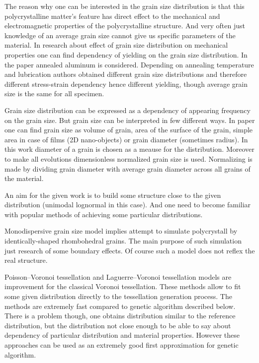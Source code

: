 \documentclass[12pt]{report}
\begin{document}
The reason why one can be interested in the grain size distribution is that this polycrystalline matter's feature has direct effect to the mechanical and electromagnetic properties of the polycrystalline structure. And very often just knowledge of an average grain size cannot give us specific parameters of the material. In research about effect of grain size distribution on mechanical properties \cite{terada10} one can find dependency of yielding on the grain size distribution. In the paper annealed aluminum is considered. Depending on annealing temperature and lubrication authors obtained different grain size distributions and therefore different stress-strain dependency hence different yielding, though average grain size is the same for all specimen.

Grain size distribution can be expressed as a dependency of appearing frequency on the grain size. But grain size can be interpreted in few different ways. In paper one can find grain size as volume of grain, area of the surface of the grain, simple area in case of films (2D nano-objects) or grain diameter (sometimes radius). In this work diameter of a grain is chosen as a meause for the distribution. Moreover to make all evolutions dimensionless normalized grain size is used. Normalizing is made by dividing grain diameter with average grain diameter across all grains of the material. 

An aim for the given work is to build some structure close to the given distribution (unimodal lognormal in this case). And one need to become familiar with popular methods of achieving some particular distributions.

Monodispersive grain size model \cite{wang96} implies attempt to simulate polycrystall by identically-shaped rhombohedral grains. The main purpose of such simulation just research of some boundary effects. Of course such a model does not reflex the real structure.

Poisson–Voronoi tessellation \cite{wear86} and Laguerre–Voronoi tessellation \cite{fan04} models are improvement for the classical Voronoi tessellation. These methods allow to fit some given distribution directly to the tessellation generation process. The methods are extremely fast compared to genetic algorithm described below. There is a problem though, one obtains distribution similar to the reference distribution, but the distribution not close enough to be able to say about dependency of particular distribution and material properties. However these approaches can be used as an extremely good first approximation for genetic algorithm.
\end{document}
